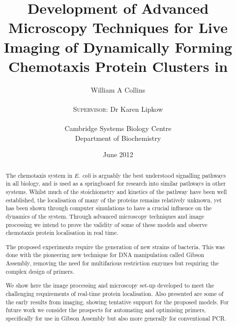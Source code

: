 \documentclass[12pt]{article}
\title{Development of Advanced Microscopy Techniques for Live Imaging of Dynamically Forming Chemotaxis Protein Clusters in \ecoli}
\date{June 2012}
\author{William A Collins\\\\\textsc{Supervisor}: Dr Karen Lipkow\\\\Cambridge Systems Biology Centre\\Department of Biochemistry}
\newcommand{\docroot}{/Users/Bill/Dropbox/Work/PhD/reports/first-year-report/}
\newcommand{\ecoli}{\textit{E. coli}\xspace}			%
\begin{document}
\setcounter{page}{1}


\maketitle
\newpage
\tableofcontents
\newpage
{}
\listoffigures
{}
\listoftables
\cleardoublepage

\begin{abstract}
The chemotaxis system in \ecoli is arguably the best understood signalling pathways in all biology, and is used as a springboard for research into similar pathways in other systems. Whilst much of the stoichiometry and kinetics of the pathway have been well established, the localisation of many of the proteins remains relatively unknown, yet has been shown through computer simulations to have a crucial influence on the dynamics of the system. Through advanced microscopy techniques and image processing we intend to prove the validity of some of these models and observe chemotaxis protein localisation in real time.


The proposed experiments require the generation of new strains of bacteria. This was done with the pioneering new technique for DNA manipulation called Gibson Assembly, removing the need for multifarious restriction enzymes but requiring the complex design of primers.


We show here the image processing and microscopy set-up developed to meet the challenging requirements of real-time protein localisation. Also presented are some of the early results from imaging, showing tentative support for the proposed models. For future work we consider the prospects for automating and optimising primers, specifically for use in Gibson Assembly but also more generally for conventional PCR.
\end{abstract}
\newpage

\setcounter{page}{1}


\cleardoublepage


\cleardoublepage


\cleardoublepage


\cleardoublepage


\cleardoublepage
\appendix

\cleardoublepage


\cleardoublepage


\cleardoublepage



\end{document}
